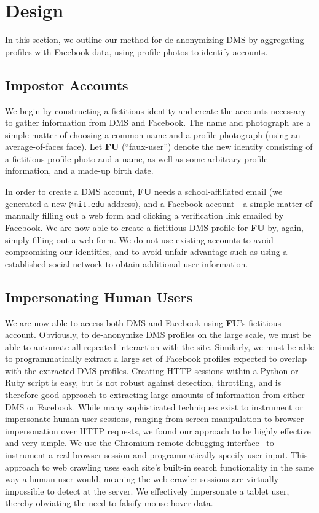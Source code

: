 \section{Design}
\label{sec:design}

In this section, we outline our method for de-anonymizing DMS by aggregating profiles with Facebook data, using profile photos to identify accounts.

\subsection{Impostor Accounts}
\label{sec:design_accounts}

We begin by constructing a fictitious identity and create the accounts necessary to gather information from DMS and Facebook.
The name and photograph are a simple matter of choosing a common name and a profile photograph (using an average-of-faces face). Let \textbf{FU} (``faux-user'') denote the new identity consisting of a fictitious profile photo and a name, as well as some arbitrary profile information, and a made-up birth date.

In order to create a DMS account, \textbf{FU} needs a school-affiliated email (we generated a new \texttt{@mit.edu} address), and a Facebook account - a simple matter of manually filling out a web form and clicking a verification link emailed by Facebook. We are now able to create a fictitious DMS profile for \textbf{FU} by, again, simply filling out a web form.
We do not use existing accounts to avoid compromising our identities, and to avoid unfair advantage such as using a established social network to obtain additional user information.

\subsection{Impersonating Human Users}
\label{sec:design_debug}

We are now able to access both DMS and Facebook using \textbf{FU}'s fictitious account.
Obviously, to de-anonymize DMS profiles on the large scale, we must be able to automate all repeated interaction with the site.
Similarly, we must be able to programmatically extract a large set of Facebook profiles expected to overlap with the extracted DMS profiles.
Creating HTTP sessions within a Python or Ruby script is easy, but is not robust against detection, throttling, and is therefore good approach to extracting large amounts of information from either DMS or Facebook.
While many sophisticated techniques exist to instrument or impersonate human user sessions, ranging from screen manipulation \cite{yeh2009sikuli} to browser impersonation over HTTP requests, we found our approach to be highly effective and very simple.
We use the Chromium remote debugging interface~\cite{chrome-rdb} to instrument a real browser session and programmatically specify user input.
This approach to web crawling uses each site's built-in search functionality in the same way a human user would, meaning the web crawler sessions are virtually impossible to detect at the server.
We effectively impersonate a tablet user, thereby obviating the need to falsify mouse hover data.

